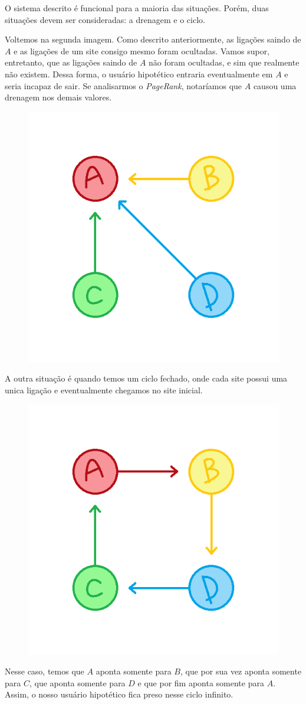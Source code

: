 \documentclass[11pt]{article}
\begin{document}
O sistema descrito é funcional para a maioria das situações. Porém, duas
situações devem ser consideradas: a drenagem e o ciclo.

    Voltemos na segunda imagem. Como descrito anteriormente, as ligações
saindo de \(A\) e as ligações de um site consigo mesmo foram ocultadas.
Vamos supor, entretanto, que as ligações saindo de \(A\) não foram
ocultadas, e sim que realmente não existem. Dessa forma, o usuário
hipotético entraria eventualmente em \(A\) e seria incapaz de sair. Se
analisarmos o \emph{PageRank}, notaríamos que \(A\) causou uma drenagem
nos demais valores.

\begin{figure}
\centering
\includegraphics[width = .4\textwidth]{../img/ABCD2.png}
\end{figure}

    A outra situação é quando temos um ciclo fechado, onde cada site possui
uma unica ligação e eventualmente chegamos no site inicial.

\begin{figure}
\centering
\includegraphics[width = .4\textwidth]{../img/ABCD4.png}
\end{figure}

Nesse caso, temos que \(A\) aponta somente para \(B\), que por sua vez aponta
somente para \(C\), que aponta somente para \(D\) e que por fim aponta
somente para \(A\). Assim, o nosso usuário hipotético fica preso nesse
ciclo infinito.
\end{document}
